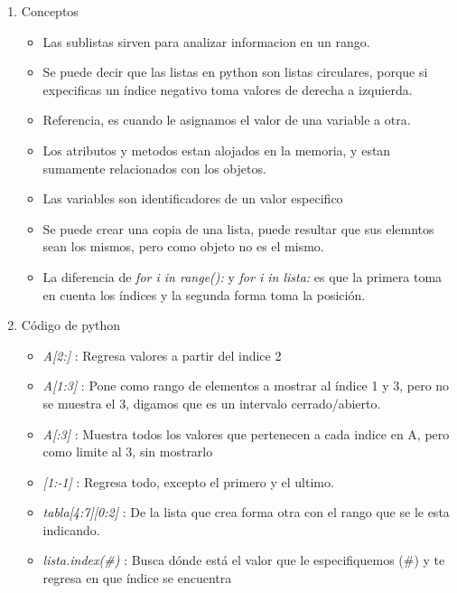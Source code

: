 \documentclass{book}
\begin{document}
\begin{flushright}
	\date{22 de enero de 2019}
\end{flushright}

\begin{enumerate}
	\item Conceptos
	\begin{itemize}
		\item Las sublistas sirven para analizar informacion en un rango.
		\item Se puede decir que las listas en python son listas circulares, porque si expecificas un índice negativo toma valores de derecha a izquierda.
		\item Referencia, es cuando le asignamos el valor de una variable a otra.
		\item Los atributos y metodos estan alojados en la memoria, y estan sumamente relacionados con los objetos.
		\item Las variables son identificadores de un valor especifico
		\item Se puede crear una copia de una lista, puede resultar que sus elemntos sean los mismos, pero como objeto no es el mismo.
		\item La diferencia de \textit{for i in range():} y \textit{for i in lista:} es que la primera toma en cuenta los índices y la segunda forma toma la posición.
	\end{itemize}
	
	
	
	\item Código de python
	\begin{itemize}
		\item {\textit{A[2:]}} : Regresa valores a partir del indice 2
		\item {\textit{A[1:3]}} : Pone como rango de elementos a mostrar al índice 1 y 3, pero no se muestra el 3, digamos que es un intervalo cerrado/abierto.
		\item {\textit{A[:3]}} : Muestra todos los valores que pertenecen a cada indice en A, pero como limite al 3, sin mostrarlo
		\item {\textit{[1:-1]}} : Regresa todo, excepto el primero y el ultimo.
		
		\item {\textit{tabla[4:7][0:2]}} : De la lista que crea forma otra con el rango que se le esta indicando.
		
		\item {\textit{lista.index(\#)}} : Busca dónde está el valor que le especifiquemos (\#) y te regresa en que índice se encuentra
		

\end{itemize}
\end{enumerate}
\end{document}
